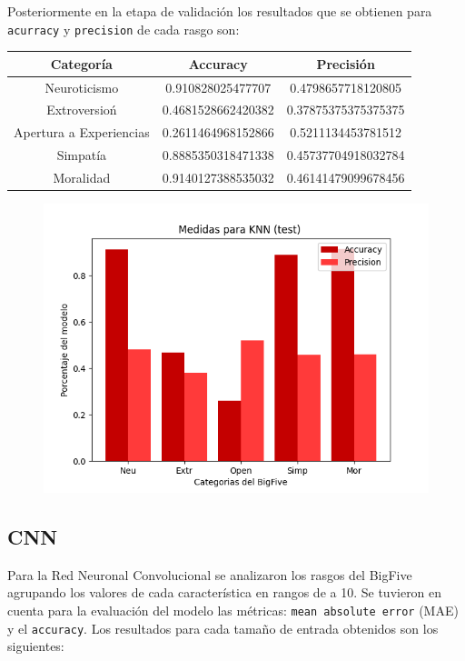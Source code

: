 \documentclass[10pt, a4paper]{article}
\begin{document}
                Posteriormente en la etapa de validaci\'on los resultados que se obtienen para \texttt{acurracy} y \texttt{precision} de cada rasgo son: 

                \begin{tabular}[h!]{|c|c|c|}

                    \hline Categor\'ia & Accuracy & Precisi\'on \\  
                    \hline Neuroticismo             & 0.910828025477707  & 0.4798657718120805 \\
                    \hline Extroversio\'n           & 0.4681528662420382 & 0.37875375375375375 \\
                    \hline Apertura a Experiencias  & 0.2611464968152866 & 0.5211134453781512 \\
                    \hline Simpat\'ia               & 0.8885350318471338 & 0.45737704918032784 \\
                    \hline Moralidad                & 0.9140127388535032 & 0.46141479099678456 \\
                    \hline
                \end{tabular}
            
                \begin{figure}[h!]
                    \centering
                    \includegraphics[width = 0.7\linewidth]{bar2_knn.png}
                \end{figure}

            \subsection{CNN} 
                Para la Red Neuronal Convolucional se analizaron los rasgos del BigFive agrupando los valores de cada caracter\'istica en rangos de a 10. 
                Se tuvieron en cuenta para la evaluaci\'on del modelo las m\'etricas: \texttt{mean absolute error} (MAE) y el \texttt{accuracy}.
                Los resultados para cada tama\~no de entrada obtenidos son los siguientes: \\
\end{document}
